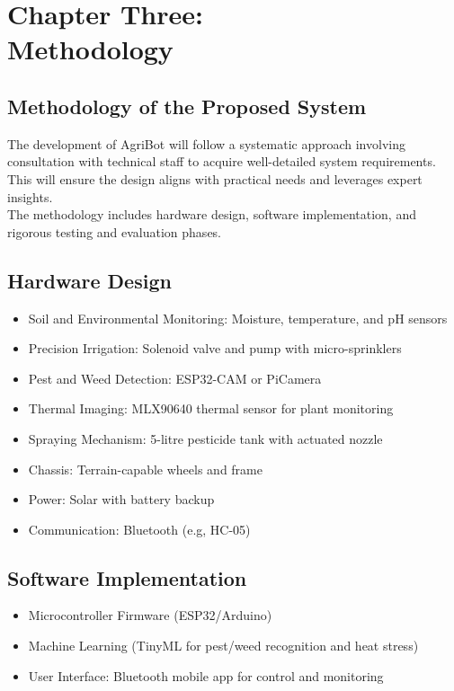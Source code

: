 \documentclass[12pt,a4paper]{report}
\begin{document}
\chapter{Chapter Three: \\Methodology}
\section{Methodology of the Proposed System}
The development of AgriBot will follow a systematic approach involving consultation with technical staff to acquire well-detailed system requirements. This will ensure the design aligns with practical needs and leverages expert insights. \\The methodology includes hardware design, software implementation, and rigorous testing and evaluation phases.

\section{Hardware Design}
\begin{itemize}
    \item Soil and Environmental Monitoring: Moisture, temperature, and pH sensors
    \item Precision Irrigation: Solenoid valve and pump with micro-sprinklers
    \item Pest and Weed Detection: ESP32-CAM or PiCamera
    \item Thermal Imaging: MLX90640 thermal sensor for plant monitoring
    \item Spraying Mechanism: 5-litre pesticide tank with actuated nozzle
    \item Chassis: Terrain-capable wheels and frame
    \item Power: Solar with battery backup
    \item Communication: Bluetooth (e.g, HC-05)
\end{itemize}

\section{Software Implementation}
\begin{itemize}
    \item Microcontroller Firmware (ESP32/Arduino)
    \item Machine Learning (TinyML for pest/weed recognition and heat stress)
    \item User Interface: Bluetooth mobile app for control and monitoring
\end{itemize}
\end{document}
